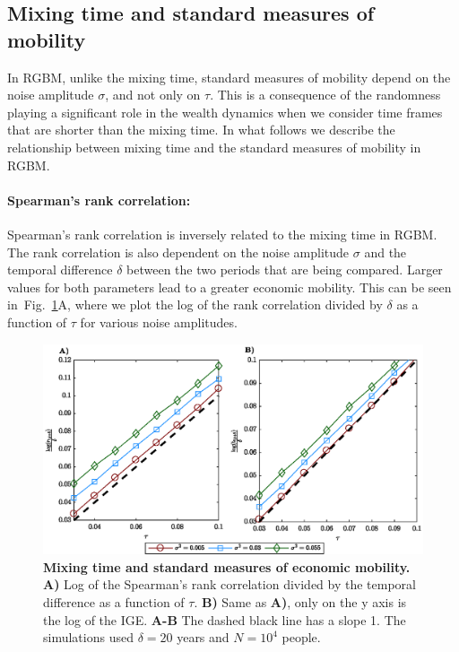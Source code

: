 \documentclass[11pt]{article}
\newcommand{\fref}[1]{Fig.~\ref{fig:#1}}
\numberwithin{equation}{section}
\begin{document}
\subsection{Mixing time and standard measures of mobility}\label{sec:measures}

In RGBM, unlike the mixing time, standard measures of mobility depend on the noise amplitude $\sigma$, and not only on $\tau$. This is a consequence of the randomness playing a significant role in the wealth dynamics when we consider time frames that are shorter than the mixing time. In what follows we describe the relationship between mixing time and the standard measures of mobility in RGBM.

\paragraph{Spearman's rank correlation:} Spearman's rank correlation is inversely related to the mixing time in RGBM. The rank correlation is also dependent on the noise amplitude $\sigma$ and the temporal difference $\delta$ between the two periods that are being compared. Larger values for both parameters lead to a greater economic mobility. This can be seen in~\fref{rgbm-standard-measures}A, where we plot the log of the rank correlation divided by $\delta$ as a function of $\tau$ for various noise amplitudes.

\begin{figure}[!htb]
\centering
\includegraphics[width=1.0\textwidth]{figs/fig_rgbm_standard_measures.eps}
\caption{\textbf{Mixing time and standard measures of economic mobility.} \textbf{A)} Log of the Spearman's rank correlation divided by the temporal difference as a function of $\tau$. \textbf{B)} Same as \textbf{A)}, only on the y axis is the log of the IGE. \textbf{A-B} The dashed black line has a slope 1. The simulations used $\delta = 20$ years and $N = 10^4$ people.
\label{fig:rgbm-standard-measures}}
\end{figure}
\end{document}

